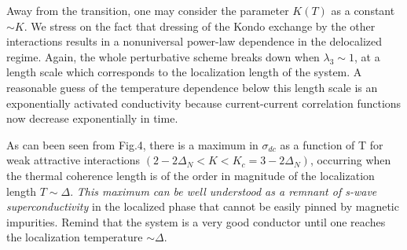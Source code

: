 Away from the transition, one may consider the parameter
$K(T)$ as a constant $\sim K$.
We stress on the fact that dressing of the Kondo exchange by the other
interactions results in a nonuniversal power-law dependence in the delocalized
regime. Again, the whole perturbative scheme breaks down when 
$\lambda_3\sim 1$, at a length
scale which corresponds to the localization length of the system. 
A reasonable
guess of the temperature dependence below this length scale is an
exponentially activated conductivity because current-current correlation
functions now decrease exponentially in time\cite{Andrei-Rosch}. 

As can been seen from Fig.4, there is a
 maximum in $\sigma_{dc}$ as a function of T
for weak attractive interactions $(2-2\Delta_N<K<K_c=3-2\Delta_N)$, occurring
when the thermal coherence length is of the order in magnitude of the
localization length $T\sim\Delta$. 
{\it This maximum can be well understood as a
 remnant of s-wave superconductivity} in the localized phase
that cannot be easily pinned
 by magnetic impurities. Remind that the system is a
very good conductor until one reaches the localization 
temperature $\sim\Delta$.


